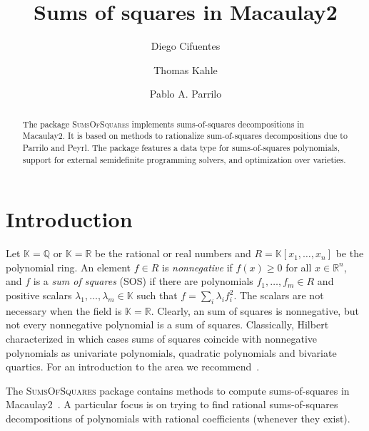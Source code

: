 \documentclass[11pt]{amsart}
\theoremstyle{plain}%
\theoremstyle{definition}
\theoremstyle{remark}
\newcommand{\Mac}{Macaulay2\xspace}
\newcommand{\SOS}{\textsc{SumsOfSquares}\xspace}
\newcommand{\QQ}{\mathbb{Q}}
\newcommand{\RR}{\mathbb{R}}
\newcommand{\kk}{\mathbb{K}}
\begin{document}
\title[Sums of squares in Macaulay2]{Sums of squares in Macaulay2}

\author{Diego Cifuentes}
\address{Massachusetts Institute of Technology \\ Cambridge, MA, USA}

\author{Thomas Kahle}
\address{Otto-von-Guericke University \\ Magdeburg, Germany}

\author{Pablo A. Parrilo}
\address{Massachusetts Institute of Technology \\ Cambridge, MA, USA}


\begin{abstract}
  The package \SOS implements sums-of-squares decompositions in
  \Mac.
  It is based on methods to rationalize sum-of-squares decompositions due to Parrilo and Peyrl.
  The package features a data type for sums-of-squares polynomials, support for external semidefinite programming solvers, and optimization over varieties.
\end{abstract}

\maketitle

\section{Introduction}
\label{s:intro}

Let $\kk \!=\! \QQ$ or $\kk \!=\! \RR$ be the rational or real numbers and $R = \kk[x_{1},\dots,x_{n}]$ be the polynomial ring.
An element $f\!\in\! R$ is \emph{nonnegative} if $f(x) \!\ge\! 0$ for all $x \!\in\! \RR^{n}$,
and $f$ is a \emph{sum of squares} (SOS) if there are polynomials $f_{1},\dots,f_{m} \!\in\! R$ and positive scalars $\lambda_{1},\dots,\lambda_{m} \!\in\! \kk$ such that $f=\sum_{i}\lambda_i f_{i}^{2}$.
The scalars are not necessary when the field is $\kk\!=\!\RR$.
Clearly, an sum of squares is nonnegative, but not every nonnegative polynomial is a sum of squares.
Classically, Hilbert characterized in which cases sums of squares coincide with nonnegative polynomials as univariate polynomials, quadratic polynomials and bivariate quartics.  
For an introduction to the area we recommend~\cite{scheiderer2009positivity,blekherman2012semidefinite}.

The \SOS package contains methods to compute sums-of-squares in \Mac~\cite{macaulay2}.
A particular focus is on trying to find rational sums-of-squares decompositions of polynomials with rational coefficients (whenever they exist).
\end{document}
